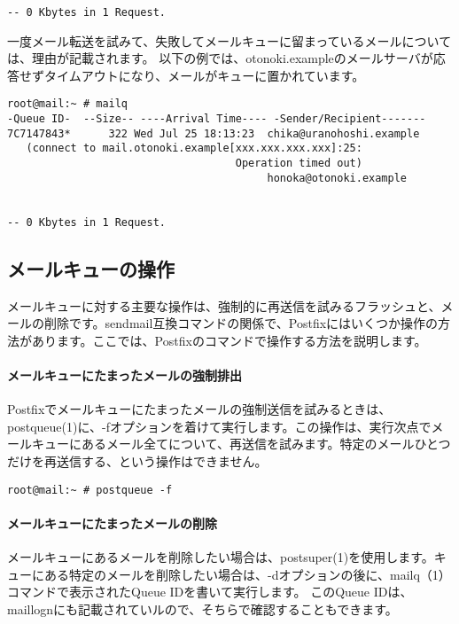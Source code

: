 {\begin{verbatim}
-- 0 Kbytes in 1 Request.
\end{verbatim}

一度メール転送を試みて、失敗してメールキューに留まっているメールについては、理由が記載されます。
以下の例では、otonoki.exampleのメールサーバが応答せずタイムアウトになり、メールがキューに置かれています。

\begin{verbatim}
root@mail:~ # mailq
-Queue ID-  --Size-- ----Arrival Time---- -Sender/Recipient-------
7C7147843*      322 Wed Jul 25 18:13:23  chika@uranohoshi.example
   (connect to mail.otonoki.example[xxx.xxx.xxx.xxx]:25: 
                                    Operation timed out)
                                         honoka@otonoki.example


-- 0 Kbytes in 1 Request.
\end{verbatim}

\subsection{メールキューの操作}

メールキューに対する主要な操作は、強制的に再送信を試みるフラッシュと、メールの削除です。sendmail互換コマンドの関係で、Postfixにはいくつか操作の方法があります。ここでは、Postfixのコマンドで操作する方法を説明します。

\paragraph{メールキューにたまったメールの強制排出}
Postfixでメールキューにたまったメールの強制送信を試みるときは、postqueue(1)に、-fオプションを着けて実行します。この操作は、実行次点でメールキューにあるメール全てについて、再送信を試みます。特定のメールひとつだけを再送信する、という操作はできません。

\begin{verbatim}
root@mail:~ # postqueue -f
\end{verbatim}


\paragraph{メールキューにたまったメールの削除}
メールキューにあるメールを削除したい場合は、postsuper(1)を使用します。キューにある特定のメールを削除したい場合は、-dオプションの後に、mailq（1）コマンドで表示されたQueue IDを書いて実行します。
このQueue IDは、maillognにも記載されていルので、そちらで確認することもできます。


}

